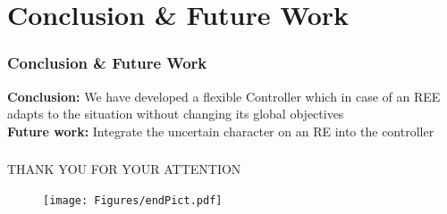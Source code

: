 \documentclass{beamer}
\begin{document}
\section{Conclusion \& Future Work}

\begin{frame}
\frametitle{Conclusion \& Future Work}
\textbf{Conclusion:} We have developed a flexible Controller which in case of an REE adapts to the situation without changing its global objectives \\
\vspace{30pt}
\textbf{Future work:} Integrate the uncertain character on an RE into the controller

\end{frame}


\begin{frame}
\frametitle{}
        \begin{center}
{\Large THANK YOU FOR YOUR ATTENTION}

\begin{figure}[!ht]

                \texttt{[image: Figures/endPict.pdf]}
                
        
\end{figure}
\end{center}

\end{frame}
\end{document}
